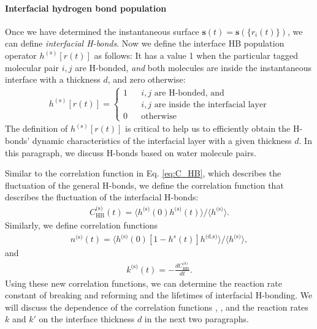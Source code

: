 \FloatBarrier
\paragraph{Interfacial hydrogen bond population} \label{IHBP}
Once we have determined the instantaneous surface ${\mathbf s}(t)={\mathbf s}(\{{r}_i(t)\})$, we can define \emph{interfacial H-bonds}.
Now we define the interface HB population operator $h^{(\text{s})}[{r}(t)]$ as follows:
It has a value 1 when the particular tagged molecular pair $i,j$ are H-bonded, \emph{and} both molecules are inside the instantaneous interface 
with a thickness $d$, and zero otherwise:
\begin{align}
   h^{(\text{s})}[{r}(t)]=\left\{
   \begin{array}{rcl}
           1       &      & {i,j\text{ are H-bonded, and}}\\
                &      & {i,j\text{ are inside the interfacial layer}} \\   \label{eqn:h_s}
           0       &      & {\text{otherwise}}
   \end{array} \right.
\end{align}
The definition of  $h^{(\text{s})}[{r}(t)]$ is critical to help us to efficiently obtain the H-bonds' dynamic characteristics of 
the interfacial layer with a given thickness $d$. %
In this paragraph, we discuss H-bonds based on water molecule pairs. 

Similar to the correlation function \CHB in Eq. \ref{eq:C_HB}, which describes the fluctuation of the general H-bonds,
we define the correlation function \CSHB that describes the fluctuation of the interfacial H-bonds: 
\begin{eqnarray}
C^\text{(s)}_{\text{HB}}(t)=\langle h^\text{(s)}(0)h^\text{(s)}(t) \rangle/\langle h^\text{(s)}\rangle
\label{eq:C_s_HB}.
\end{eqnarray}
%
Similarly, we define correlation functions 
\begin{eqnarray}
n^\text{(s)}(t)=\langle h^\text{(s)}(0)[1-h^s(t)]h^{\text{(d,s)}} \rangle/\langle h^\text{(s)}\rangle
\label{eq:n_s_HB},
\end{eqnarray}
and 
\begin{eqnarray}
k^\text{(s)}(t)= -\frac{dC^\text{(s)}_\text{HB}}{dt}
\label{eq:k_s_HB}.
\end{eqnarray}
Using these new correlation functions, we can determine the reaction rate constant of breaking and reforming and the lifetimes of interfacial H-bonding.
We will discuss the dependence of the correlation functions \CHB, \CSHB, and the reaction rates $k$ and $k'$ on the interface thickness $d$ in the next two paragraphs.
%
\FloatBarrier
